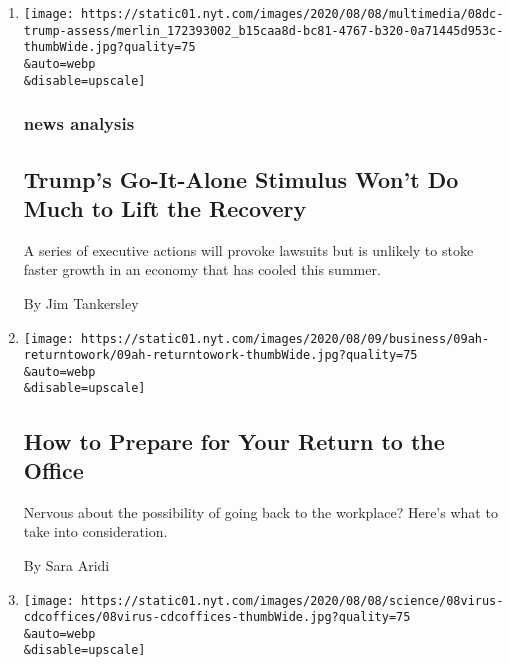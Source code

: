 \begin{enumerate}
\def\labelenumi{\arabic{enumi}.}
\item
  \href{/2020/08/08/business/trump-stimulus-recovery.html}{}

  \texttt{[image: https://static01.nyt.com/images/2020/08/08/multimedia/08dc-trump-assess/merlin\_172393002\_b15caa8d-bc81-4767-b320-0a71445d953c-thumbWide.jpg?quality=75\\\&auto=webp\\\&disable=upscale]}

  \hypertarget{news-analysis}{%
  \subsubsection{news analysis}\label{news-analysis}}

  \hypertarget{trumps-go-it-alone-stimulus-wont-do-much-to-lift-the-recovery}{%
  \subsection{Trump's Go-It-Alone Stimulus Won't Do Much to Lift the
  Recovery}\label{trumps-go-it-alone-stimulus-wont-do-much-to-lift-the-recovery}}

  A series of executive actions will provoke lawsuits but is unlikely to
  stoke faster growth in an economy that has cooled this summer.

  By Jim Tankersley
\item
  \href{/2020/08/08/at-home/office-return-coronavirus.html}{}

  \texttt{[image: https://static01.nyt.com/images/2020/08/09/business/09ah-returntowork/09ah-returntowork-thumbWide.jpg?quality=75\\\&auto=webp\\\&disable=upscale]}

  \hypertarget{how-to-prepare-for-your-return-to-the-office}{%
  \subsection{How to Prepare for Your Return to the
  Office}\label{how-to-prepare-for-your-return-to-the-office}}

  Nervous about the possibility of going back to the workplace? Here's
  what to take into consideration.

  By Sara Aridi
\item
  \href{/2020/08/08/health/cdc-legionnaires-coronavirus.html}{}

  \texttt{[image: https://static01.nyt.com/images/2020/08/08/science/08virus-cdcoffices/08virus-cdcoffices-thumbWide.jpg?quality=75\\\&auto=webp\\\&disable=upscale]}


\end{enumerate}
